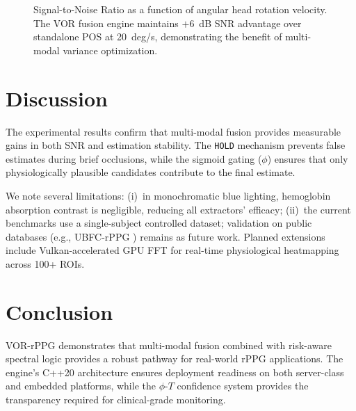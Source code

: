\documentclass[9pt,technote,twocolumn,compsoc]{article}
\begin{document}
\begin{figure}[t]
\centering
{}
\caption{Signal-to-Noise Ratio as a function of angular head rotation velocity. The VOR fusion engine maintains $+6$~dB SNR advantage over standalone POS at 20~deg/s, demonstrating the benefit of multi-modal variance optimization.}
\label{fig:snr}
\end{figure}

\section{Discussion}
The experimental results confirm that multi-modal fusion provides measurable gains in both SNR and estimation stability. The \texttt{HOLD} mechanism prevents false estimates during brief occlusions, while the sigmoid gating ($\phi$) ensures that only physiologically plausible candidates contribute to the final estimate.

We note several limitations: (i)~in monochromatic blue lighting, hemoglobin absorption contrast is negligible, reducing all extractors' efficacy; (ii)~the current benchmarks use a single-subject controlled dataset; validation on public databases (e.g., UBFC-rPPG \cite{bobbia2019}) remains as future work. Planned extensions include Vulkan-accelerated GPU FFT for real-time physiological heatmapping across 100+ ROIs.

\section{Conclusion}
VOR-rPPG demonstrates that multi-modal fusion combined with risk-aware spectral logic provides a robust pathway for real-world rPPG applications. The engine's C++20 architecture ensures deployment readiness on both server-class and embedded platforms, while the $\phi$-$T$ confidence system provides the transparency required for clinical-grade monitoring.
\end{document}
